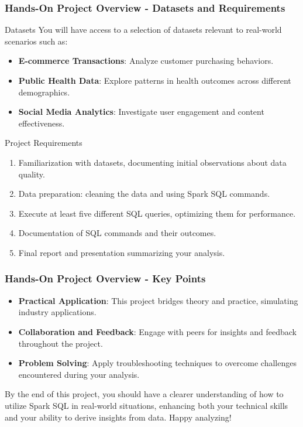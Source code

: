 \documentclass[aspectratio=169]{beamer}
\begin{document}
\begin{frame}[fragile]
    \frametitle{Hands-On Project Overview - Datasets and Requirements}
    \begin{block}{Datasets}
        You will have access to a selection of datasets relevant to real-world scenarios such as:
        \begin{itemize}
            \item \textbf{E-commerce Transactions}: Analyze customer purchasing behaviors.
            \item \textbf{Public Health Data}: Explore patterns in health outcomes across different demographics.
            \item \textbf{Social Media Analytics}: Investigate user engagement and content effectiveness.
        \end{itemize}
    \end{block}

    \begin{block}{Project Requirements}
        \begin{enumerate}
            \item Familiarization with datasets, documenting initial observations about data quality.
            \item Data preparation: cleaning the data and using Spark SQL commands.
            \item Execute at least five different SQL queries, optimizing them for performance.
            \item Documentation of SQL commands and their outcomes.
            \item Final report and presentation summarizing your analysis.
        \end{enumerate}
    \end{block}
\end{frame}

\begin{frame}[fragile]
    \frametitle{Hands-On Project Overview - Key Points}
    \begin{itemize}
        \item \textbf{Practical Application}: This project bridges theory and practice, simulating industry applications.
        \item \textbf{Collaboration and Feedback}: Engage with peers for insights and feedback throughout the project.
        \item \textbf{Problem Solving}: Apply troubleshooting techniques to overcome challenges encountered during your analysis.
    \end{itemize}

    By the end of this project, you should have a clearer understanding of how to utilize Spark SQL in real-world situations, 
    enhancing both your technical skills and your ability to derive insights from data. Happy analyzing!
\end{frame}
\end{document}
